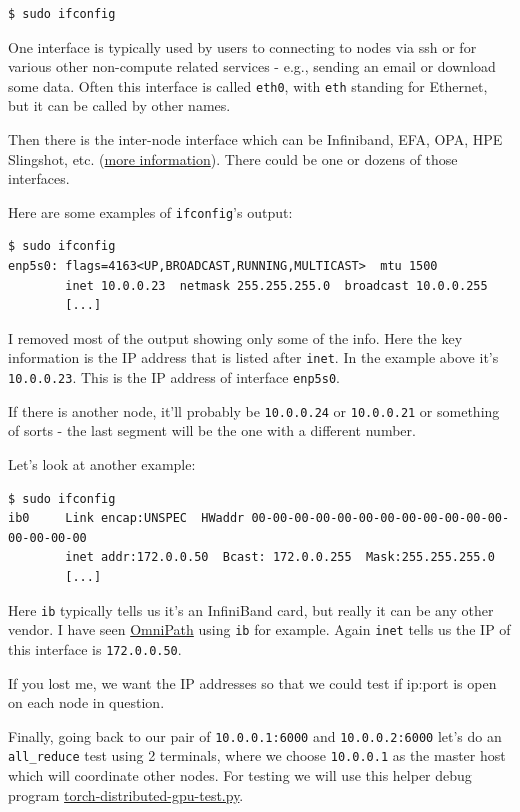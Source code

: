 \documentclass[
]{report}
\begin{document}
\begin{verbatim}
$ sudo ifconfig
\end{verbatim}

One interface is typically used by users to connecting to nodes via ssh
or for various other non-compute related services - e.g., sending an
email or download some data. Often this interface is called
\texttt{eth0}, with \texttt{eth} standing for Ethernet, but it can be
called by other names.

Then there is the inter-node interface which can be Infiniband, EFA,
OPA, HPE Slingshot, etc. (\href{../network\#inter-node-networking}{more
information}). There could be one or dozens of those interfaces.

Here are some examples of \texttt{ifconfig}'s output:

\begin{verbatim}
$ sudo ifconfig
enp5s0: flags=4163<UP,BROADCAST,RUNNING,MULTICAST>  mtu 1500
        inet 10.0.0.23  netmask 255.255.255.0  broadcast 10.0.0.255
        [...]
\end{verbatim}

I removed most of the output showing only some of the info. Here the key
information is the IP address that is listed after \texttt{inet}. In the
example above it's \texttt{10.0.0.23}. This is the IP address of
interface \texttt{enp5s0}.

If there is another node, it'll probably be \texttt{10.0.0.24} or
\texttt{10.0.0.21} or something of sorts - the last segment will be the
one with a different number.

Let's look at another example:

\begin{verbatim}
$ sudo ifconfig
ib0     Link encap:UNSPEC  HWaddr 00-00-00-00-00-00-00-00-00-00-00-00-00-00-00-00
        inet addr:172.0.0.50  Bcast: 172.0.0.255  Mask:255.255.255.0
        [...]
\end{verbatim}

Here \texttt{ib} typically tells us it's an InfiniBand card, but really
it can be any other vendor. I have seen
\href{../network\#omnipath}{OmniPath} using \texttt{ib} for example.
Again \texttt{inet} tells us the IP of this interface is
\texttt{172.0.0.50}.

If you lost me, we want the IP addresses so that we could test if
ip:port is open on each node in question.

Finally, going back to our pair of \texttt{10.0.0.1:6000} and
\texttt{10.0.0.2:6000} let's do an \texttt{all\_reduce} test using 2
terminals, where we choose \texttt{10.0.0.1} as the master host which
will coordinate other nodes. For testing we will use this helper debug
program
\href{./torch-distributed-gpu-test.py}{torch-distributed-gpu-test.py}.
\end{document}
